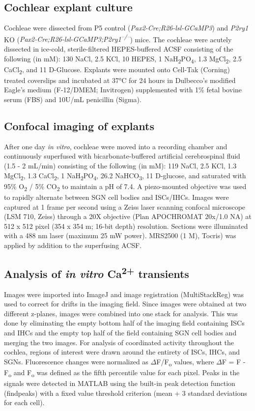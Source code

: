 \documentclass[9pt,lineno]{elife}
\begin{document}
\subsection{Cochlear explant culture}
Cochleae were dissected from P5 control (\textit{Pax2-Cre;R26-lsl-GCaMP3}) and \textit{P2ry1} KO (\textit{Pax2-Cre;R26-lsl-GCaMP3;P2ry1\textsuperscript{–/–}}) mice. The cochleae were acutely dissected in ice-cold, sterile-filtered HEPES-buffered ACSF consisting of the following (in mM): 130 NaCl, 2.5 KCl, 10 HEPES, 1 NaH\textsubscript{2}PO\textsubscript{4}, 1.3 MgCl\textsubscript{2}, 2.5 CaCl\textsubscript{2}, and 11 D-Glucose. Explants were mounted onto Cell-Tak (Corning) treated coverslips and incubated at 37°C for 24 hours in Dulbecco’s modified Eagle’s medium (F-12/DMEM; Invitrogen) supplemented with 1\% fetal bovine serum (FBS) and 10U/mL penicillin (Sigma).

\subsection{Confocal imaging of explants}
After one day \textit{in vitro}, cochleae were moved into a recording chamber and continuously superfused with bicarbonate-buffered artificial cerebrospinal fluid (1.5 - 2 mL/min) consisting of the following (in mM): 119 NaCl, 2.5 KCl, 1.3 MgCl\textsubscript{2}, 1.3 CaCl\textsubscript{2}, 1 NaH\textsubscript{2}PO\textsubscript{4}, 26.2 NaHCO\textsubscript{3}, 11 D-glucose, and saturated with 95\% O\textsubscript{2} / 5\% CO\textsubscript{2} to maintain a pH of 7.4. A piezo-mounted objective was used to rapidly alternate between SGN cell bodies and ISCs/IHCs. Images were captured at 1 frame per second using a Zeiss laser scanning confocal microscope (LSM 710, Zeiss) through a 20X objective (Plan APOCHROMAT 20x/1.0 NA) at 512 x 512 pixel (354 x 354 \textmu m; 16-bit depth) resolution. Sections were illuminated with a 488 nm laser (maximum 25 mW power). MRS2500 (1 \textmu M), Tocris) was applied by addition to the superfusing ACSF.

\subsection{Analysis of \textit{in vitro} Ca\textsuperscript{2+} transients}
Images were imported into ImageJ and image registration (MultiStackReg) was used to correct for drifts in the imaging field. Since images were obtained at two different z-planes, images were combined into one stack for analysis. This was done by eliminating the empty bottom half of the imaging field containing ISCs and IHCs and the empty top half of the field containing SGN cell bodies and merging the two images. For analysis of coordinated activity throughout the cochlea, regions of interest were drawn around the entirety of ISCs, IHCs, and SGNs. Fluorescence changes were normalized as $ \Delta $F/F\textsubscript{o} values, where $ \Delta $F = F - F\textsubscript{o} and F\textsubscript{o} was defined as the fifth percentile value for each pixel. Peaks in the signals were detected in MATLAB using the built-in peak detection function (findpeaks) with a fixed value threshold criterion (mean + 3 standard deviations for each cell).
\end{document}
